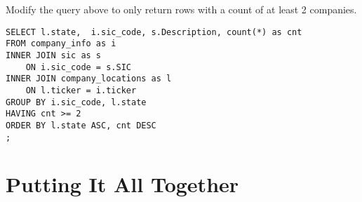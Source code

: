 \documentclass[10pt]{exam}
\begin{document}
\begin{questions}
\question Modify the query above to only return rows with a count
of at least 2 companies.

\begin{solution}
\begin{lstlisting}
SELECT l.state,  i.sic_code, s.Description, count(*) as cnt
FROM company_info as i
INNER JOIN sic as s
    ON i.sic_code = s.SIC
INNER JOIN company_locations as l
    ON l.ticker = i.ticker
GROUP BY i.sic_code, l.state
HAVING cnt >= 2
ORDER BY l.state ASC, cnt DESC
;
\end{lstlisting}
\end{solution}

\end{questions}


\section{Putting It All Together}
\end{document}
